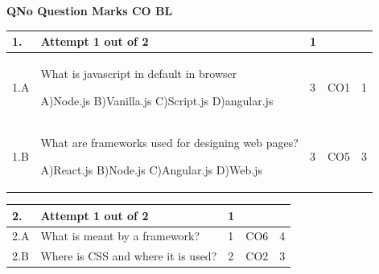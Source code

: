 \documentclass[12pt]{article}
\begin{document}
	\begin{flushleft}
	\bf{QNo}\hspace{1.2cm} \bf{Question} \hspace{5.5cm}  \bf{Marks} \hspace{0.2cm} \bf{CO} \hspace{0.2cm}	\bf{BL}	
	
\end{flushleft} 
	\begin{tabular}{|L{1cm}|L{8cm}|C{1cm}|C{1cm}|C{1cm}|}\hline
		\bf{1}. & \bf{Attempt} \bf1 \bf{out} of \bf2 & \bf1  & & \\ \hline
				1.A & What is javascript in default in browser \newline
					
		A)Node.js\newline
		B)Vanilla.js\newline
		C)Script.js\newline
		D)angular.js &
		3 &
		CO1&
		1 \\ \hline
		
				1.B & What are frameworks used for designing web pages? \newline
					
		A)React.js\newline
		B)Node.js\newline
		C)Angular.js\newline
		D)Web.js &
		3 &
		CO5&
		3 \\ \hline
		
		
	\end{tabular}

	\begin{tabular}{|L{1cm}|L{8cm}|C{1cm}|C{1cm}|C{1cm}|}\hline
	\bf2. & \bf{Attempt} \bf{1} \bf{out of} \bf{2} & \bf{1}  & & \\ \hline





		2.A &
	What is meant by a framework? \newline
			
	 &  1 & CO6 & 4\\ \hline
		2.B &
	Where is CSS and where it is used? \newline
			
	 &  2 & CO2 & 3\\ \hline
	\end{tabular}
\end{document}
